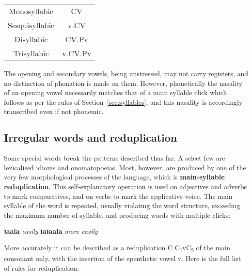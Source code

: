 \documentclass[11pt,a5paper]{book}
\newcommand{\qcn}[1]{\textcolor{AccentText}{\large\textbf{#1}}}
\newcommand{\transl}[2]{\qcn{#1} \emph{#2}}
\begin{document}
\begin{center}
\begin{tabular}{cc}
	Monosyllabic &  CV \\
	Sesquisyllabic &   v.\stress{}CV \\
	Disyllabic & \stress{}CV.Pv\\
	Trisyllabic & v.\stress{}CV.Pv
\end{tabular}
\end{center}

The opening and secondary vowels, being unstressed, may not carry registers, and no distinction of phonation is made on them. However, phonetically the nasality of an opening vowel necessarily matches that of a main syllable click which follows as per the rules of Section~\ref{sec:syllables}, and this nasality is accordingly transcribed even if not phonemic.

\subsection{Irregular words and reduplication}\label{sec:redup}

Some special words break the patterns described thus far. A select few are lexicalised idioms and onomatopoeias. Most, however, are produced by one of the very few morphological processes of the language, which is \textbf{main-syllable reduplication}. This self-explanatory operation is used on adjectives and adverbs to mark comparatives, and on verbs to mark the applicative voice. The main syllable of the word is repeated, usually violating the word structure, exceeding the maximum number of syllable, and producing words with multiple clicks:

\begin{center}
\transl{ʇaala}{easily} \textrightarrow \transl{ʇaʇaala}{more easily}
\end{center}

More accurately it can be described as a reduplication C \textrightarrow C\textsubscript{1}vC\textsubscript{2} of the main consonant only, with the insertion of the epenthetic vowel v. Here is the full list of rules for reduplication:
\end{document}
